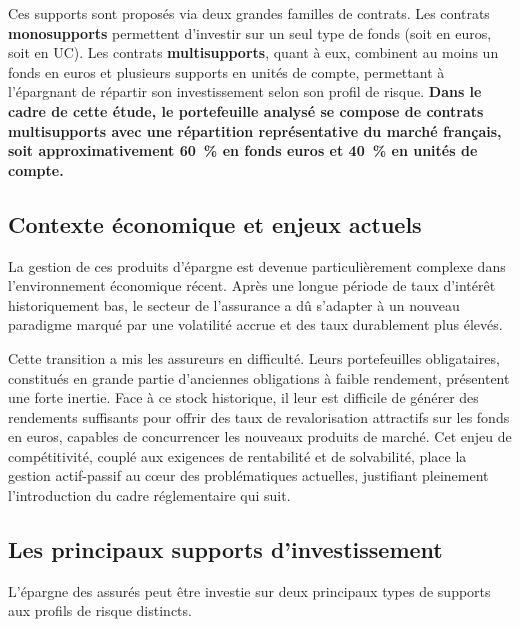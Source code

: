 \bigskip

Ces supports sont proposés via deux grandes familles de contrats. Les contrats \textbf{monosupports} permettent d'investir sur un seul type de fonds (soit en euros, soit en UC). Les contrats \textbf{multisupports}, quant à eux, combinent au moins un fonds en euros et plusieurs supports en unités de compte, permettant à l'épargnant de répartir son investissement selon son profil de risque.
\textbf{Dans le cadre de cette étude, le portefeuille analysé se compose de contrats multisupports avec une répartition représentative du marché français, soit approximativement 60~\% en fonds euros et 40~\% en unités de compte.}

\subsection{Contexte économique et enjeux actuels}

La gestion de ces produits d'épargne est devenue particulièrement complexe dans l'environnement économique récent. Après une longue période de taux d'intérêt historiquement bas, le secteur de l'assurance a dû s'adapter à un nouveau paradigme marqué par une volatilité accrue et des taux durablement plus élevés.

\bigskip

Cette transition a mis les assureurs en difficulté. Leurs portefeuilles obligataires, constitués en grande partie d'anciennes obligations à faible rendement, présentent une forte inertie. Face à ce stock historique, il leur est difficile de générer des rendements suffisants pour offrir des taux de revalorisation attractifs sur les fonds en euros, capables de concurrencer les nouveaux produits de marché. Cet enjeu de compétitivité, couplé aux exigences de rentabilité et de solvabilité, place la gestion actif-passif au cœur des problématiques actuelles, justifiant pleinement l'introduction du cadre réglementaire qui suit.

\subsection{Les principaux supports d'investissement}

L'épargne des assurés peut être investie sur deux principaux types de supports aux profils de risque distincts.

\bigskip

